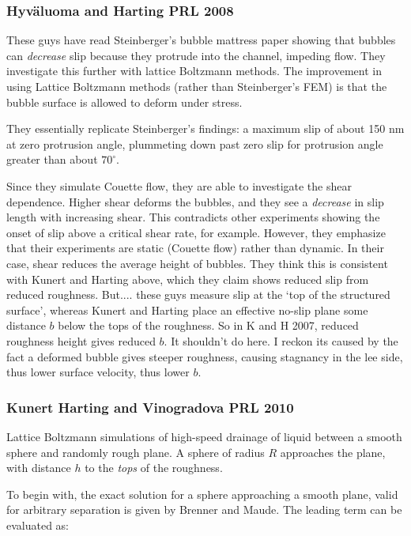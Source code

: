 \documentclass{article}
\begin{document}
\subsubsection*{Hyv\"{a}luoma and Harting PRL 2008}

These guys have read Steinberger's bubble mattress paper showing that bubbles can \emph{decrease} slip because they protrude into the channel, impeding flow.  They investigate this further with lattice Boltzmann methods.  The improvement in using Lattice Boltzmann methods (rather than Steinberger's FEM) is that the bubble surface is allowed to deform under stress.

They essentially replicate Steinberger's findings: a maximum slip of about 150 nm at zero protrusion angle, plummeting down past zero slip for protrusion angle greater than about $70^{\circ}$.

Since they simulate Couette flow, they are able to investigate the shear dependence.  Higher shear deforms the bubbles, and they see a \emph{decrease} in slip length with increasing shear. This contradicts other experiments showing the onset of slip above a critical shear rate, for example.  However, they emphasize that their experiments are static (Couette flow) rather than dynamic.  In their case, shear reduces the average height of bubbles.  They think this is consistent with Kunert and Harting above, which they claim shows reduced slip from reduced roughness.  But.... these guys measure slip at the `top of the structured surface', whereas Kunert and Harting place an effective no-slip plane some distance $b$ below the tops of the roughness. So in K and H 2007, reduced roughness height gives reduced $b$.  It shouldn't do here.  I reckon its caused by the fact a deformed bubble gives steeper roughness, causing stagnancy in the lee side, thus lower surface velocity, thus lower $b$.


\subsubsection*{Kunert Harting and Vinogradova PRL 2010}

Lattice Boltzmann simulations of high-speed drainage of liquid between a smooth sphere and randomly rough plane.  A sphere of radius $R$ approaches the plane, with distance $h$ to the \emph{tops} of the roughness.

To begin with, the exact solution for a sphere approaching a smooth plane, valid for arbitrary separation is given by Brenner and Maude.  The leading term can be evaluated as:
\end{document}

